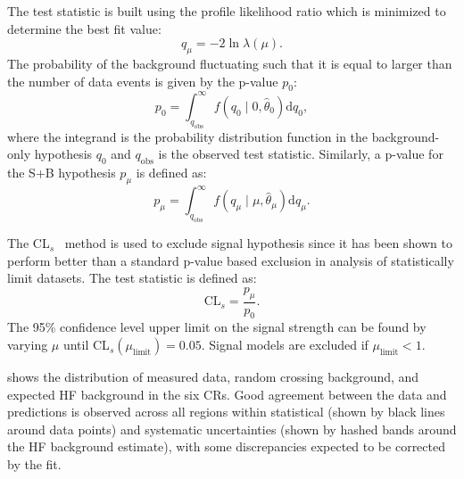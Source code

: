 The test statistic is built using the profile likelihood ratio which is minimized to determine the best fit value:
\begin{equation}
    q_{\mu} = -2\ln{\lambda(\mu)}.
\end{equation}
The probability of the background fluctuating such that it is equal to larger than the number of data events is given by the p-value $p_0$:
\begin{equation}
    p_0=\int_{q_{\mathrm{obs}}}^{\infty} f\left(q_0 \mid 0, \hat{\theta}_0\right) \mathrm{d} q_0,
\end{equation}
where the integrand is the probability distribution function in the background-only hypothesis $q_0$ and $q_{\mathrm{obs}}$ is the observed test statistic. Similarly, a p-value for the S+B hypothesis $p_{\mu}$ is defined as:
\begin{equation}
    p_\mu=\int_{q_{\mathrm{obs}}}^{\infty} f\left(q_\mu \mid \mu, \hat{\theta}_\mu\right) \mathrm{d} q_\mu.
\end{equation}

The CL$_{s}$~\cite{Read_2002} method is used to exclude signal hypothesis since it has been shown to perform better than a standard p-value based exclusion in analysis of statistically limit datasets. The test statistic is defined as:
\begin{equation}
    \mathrm{CL}_s = \frac{p_\mu}{p_0}.
\end{equation}
The 95\% confidence level upper limit on the signal strength can be found by varying $\mu$ until CL$_s (\mu_\mathrm{limit})=0.05$. Signal models are excluded if $\mu_{\mathrm{limit}} < 1$.

 shows the \mdv distribution of measured data, random crossing background, and expected HF background in the six CRs. Good agreement between the data and predictions is observed across all regions within statistical (shown by black lines around data points) and systematic uncertainties (shown by hashed bands around the HF background estimate), with some discrepancies expected to be corrected by the fit.

